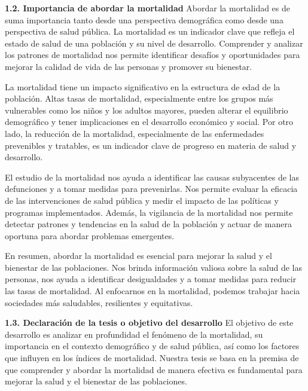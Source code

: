 \documentclass[8pt,a4paper]{beamer}
\begin{document}
{\begin{frame}{}
\begin{block}{\textbf{1.2. Importancia de abordar la mortalidad}}
\setlength{\parskip}{3px}
\justifying
Abordar la mortalidad es de suma importancia tanto desde una perspectiva demográfica como desde una perspectiva de salud pública. La mortalidad es un indicador clave que refleja el estado de salud de una población y su nivel de desarrollo. Comprender y analizar los patrones de mortalidad nos permite identificar desafíos y oportunidades para mejorar la calidad de vida de las personas y promover su bienestar.

La mortalidad tiene un impacto significativo en la estructura de edad de la población. Altas tasas de mortalidad, especialmente entre los grupos más vulnerables como los niños y los adultos mayores, pueden alterar el equilibrio demográfico y tener implicaciones en el desarrollo económico y social. Por otro lado, la reducción de la mortalidad, especialmente de las enfermedades prevenibles y tratables, es un indicador clave de progreso en materia de salud y desarrollo.

El estudio de la mortalidad nos ayuda a identificar las causas subyacentes de las defunciones y a tomar medidas para prevenirlas. Nos permite evaluar la eficacia de las intervenciones de salud pública y medir el impacto de las políticas y programas implementados. Además, la vigilancia de la mortalidad nos permite detectar patrones y tendencias en la salud de la población y actuar de manera oportuna para abordar problemas emergentes.

\end{block}
\end{frame}

\begin{frame}{}
\begin{block}{}
\setlength{\parskip}{3px}
\justifying

En resumen, abordar la mortalidad es esencial para mejorar la salud y el bienestar de las poblaciones. Nos brinda información valiosa sobre la salud de las personas, nos ayuda a identificar desigualdades y a tomar medidas para reducir las tasas de mortalidad. Al enfocarnos en la mortalidad, podemos trabajar hacia sociedades más saludables, resilientes y equitativas.

\end{block}

\end{frame}


\begin{frame}{}
\begin{block}{\textbf{1.3. Declaración de la tesis o objetivo del desarrollo}}
\setlength{\parskip}{3px}
\justifying
El objetivo de este desarrollo es analizar en profundidad el fenómeno de la mortalidad, su importancia en el contexto demográfico y de salud pública, así como los factores que influyen en los índices de mortalidad. Nuestra tesis se basa en la premisa de que comprender y abordar la mortalidad de manera efectiva es fundamental para mejorar la salud y el bienestar de las poblaciones.


\end{block}
\end{frame}}
\end{document}
